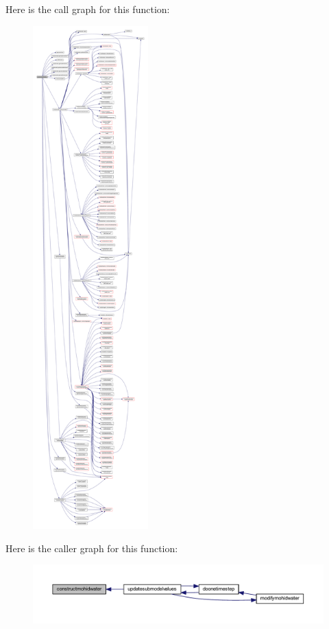 Here is the call graph for this function\+:\nopagebreak
\begin{figure}[H]
\begin{center}
\leavevmode
\includegraphics[height=550pt]{_main_8_f90_abc6cfc7bca3f0c4dda032a34b9690319_cgraph}
\end{center}
\end{figure}
Here is the caller graph for this function\+:\nopagebreak
\begin{figure}[H]
\begin{center}
\leavevmode
\includegraphics[width=350pt]{_main_8_f90_abc6cfc7bca3f0c4dda032a34b9690319_icgraph}
\end{center}
\end{figure}
\mbox{\label{_main_8_f90_a364d1a7b4621ef3a56c71daf2af5147e}} 
